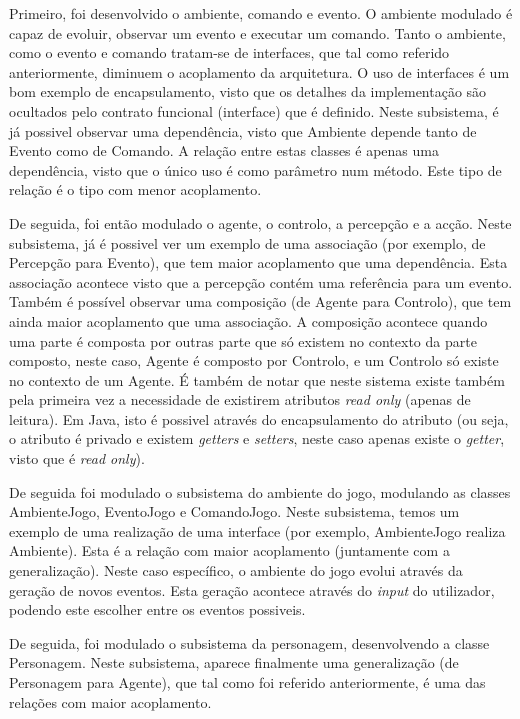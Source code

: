 \documentclass[a4paper,12pt]{article}
\begin{document}
Primeiro, foi desenvolvido o ambiente, comando e evento. O ambiente modulado é capaz de evoluir, observar um evento e executar um comando.
Tanto o ambiente, como o evento e comando tratam-se de interfaces, que tal como referido anteriormente, diminuem o acoplamento da arquitetura. O uso de interfaces é um bom exemplo de encapsulamento, visto que os detalhes da implementação são ocultados pelo contrato funcional (interface) que é definido.
Neste subsistema, é já possivel observar uma dependência, visto que Ambiente depende tanto de Evento como de Comando. A relação entre estas classes é apenas uma dependência, visto que o único uso é como parâmetro num método. Este tipo de relação é o tipo com menor acoplamento.

De seguida, foi então modulado o agente, o controlo, a percepção e a acção.
Neste subsistema, já é possivel ver um exemplo de uma associação (por exemplo, de Percepção para Evento), que tem maior acoplamento que uma dependência. Esta associação acontece visto que a percepção contém uma referência para um evento.
Também é possível observar uma composição (de Agente para Controlo), que tem ainda maior acoplamento que uma associação. A composição acontece quando uma parte é composta por outras parte que só existem no contexto da parte composto, neste caso, Agente é composto por Controlo, e um Controlo só existe no contexto de um Agente.
É também de notar que neste sistema existe também pela primeira vez a necessidade de existirem atributos \textit{read only} (apenas de leitura). Em Java, isto é possivel através do encapsulamento do atributo (ou seja, o atributo é privado e existem \textit{getters} e \textit{setters}, neste caso apenas existe o \textit{getter}, visto que é \textit{read only}).

De seguida foi modulado o subsistema do ambiente do jogo, modulando as classes AmbienteJogo, EventoJogo e ComandoJogo.
Neste subsistema, temos um exemplo de uma realização de uma interface (por exemplo, AmbienteJogo realiza Ambiente). Esta é a relação com maior acoplamento (juntamente com a generalização).
Neste caso específico, o ambiente do jogo evolui através da geração de novos eventos. Esta geração acontece através do \textit{input} do utilizador, podendo este escolher entre os eventos possiveis.

De seguida, foi modulado o subsistema da personagem, desenvolvendo a classe Personagem.
Neste subsistema, aparece finalmente uma generalização (de Personagem para Agente), que tal como foi referido anteriormente, é uma das relações com maior acoplamento.
\end{document}
